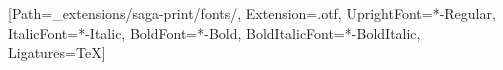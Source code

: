 \makeatletter

\setmainfont{EBGaramond}[Path=_extensions/saga-print/fonts/, Extension=.otf,
  UprightFont=*-Regular, ItalicFont=*-Italic, BoldFont=*-Bold, BoldItalicFont=*-BoldItalic,
  Ligatures=TeX]

\setlength{\parindent}{1.25em}
\setlength{\parskip}{0pt}
\raggedbottom
{}

\newcommand{\sagaornament}{{\centering\normalfont\textasteriskcentered\hspace{0.9em}\textasteriskcentered\hspace{0.9em}\textasteriskcentered\par}}
\newcommand{\sagabreak}{\par\vspace{0.7\baselineskip}\noindent{\centering\normalfont\textasteriskcentered\hspace{0.9em}\textasteriskcentered\hspace{0.9em}\textasteriskcentered\par}\vspace{0.7\baselineskip}\@afterindentfalse\@afterheading}
\newcommand{\sagadateline}[1]{\par{\centering\normalfont\itshape\small #1\par}\vspace{1.2\baselineskip}\@afterindentfalse\@afterheading}

